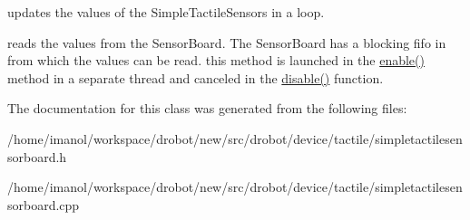 updates the values of the Simple\-Tactile\-Sensors in a loop. 

reads the values from the Sensor\-Board. The Sensor\-Board has a blocking fifo in from which the values can be read. this method is launched in the \hyperlink{classdrobot_1_1device_1_1tactile_1_1SimpleTactileSensorBoard_a1660e1e8cd1d5705936a28ce9294d759}{enable()} method in a separate thread and canceled in the \hyperlink{classdrobot_1_1device_1_1DeviceBoard_a65eb028173bd7308192f1781d18f292d}{disable()} function. 

The documentation for this class was generated from the following files\-:\begin{DoxyCompactItemize}
\item 
/home/imanol/workspace/drobot/new/src/drobot/device/tactile/simpletactilesensorboard.\-h\item 
/home/imanol/workspace/drobot/new/src/drobot/device/tactile/simpletactilesensorboard.\-cpp\end{DoxyCompactItemize}
